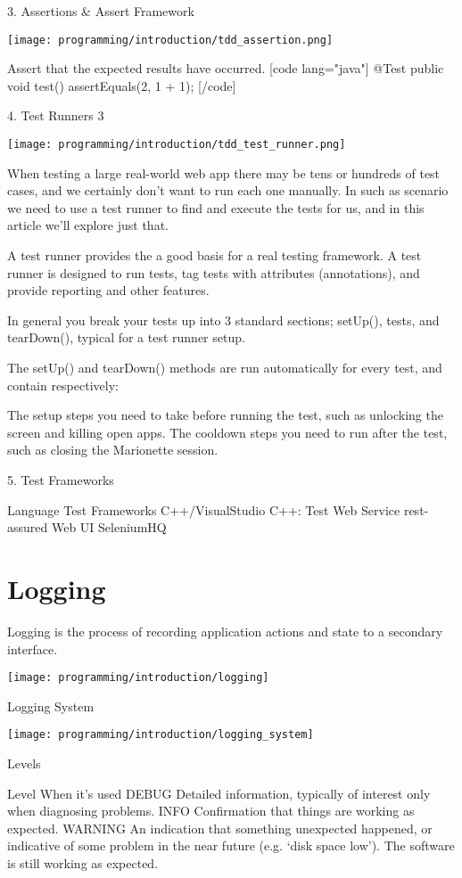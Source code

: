 3. Assertions & Assert Framework

\texttt{[image: programming/introduction/tdd\_assertion.png]}

Assert that the expected results have occurred.
[code lang="java"] @Test public void test() { assertEquals(2, 1 + 1); } [/code]


4. Test Runners 3

\texttt{[image: programming/introduction/tdd\_test\_runner.png]}

When testing a large real-world web app there may be tens or hundreds of test cases, and we certainly don't want to run each one manually. In such as scenario we need to use a test runner to find and execute the tests for us, and in this article we'll explore just that.

A test runner provides the a good basis for a real testing framework. A test runner is designed to run tests, tag tests with attributes (annotations), and provide reporting and other features.

In general you break your tests up into 3 standard sections; setUp(), tests, and tearDown(), typical for a test runner setup.

The setUp() and tearDown() methods are run automatically for every test, and contain respectively:

The setup steps you need to take before running the test, such as unlocking the screen and killing open apps.
The cooldown steps you need to run after the test, such as closing the Marionette session.

5. Test Frameworks

Language	Test Frameworks
C++/VisualStudio	C++: Test
Web Service	rest-assured
Web UI	SeleniumHQ

\section{Logging}

Logging is the process of recording application actions and state to a secondary interface.

\texttt{[image: programming/introduction/logging]}

Logging System

\texttt{[image: programming/introduction/logging\_system]}

Levels

Level	When it’s used
DEBUG	Detailed information, typically of interest only when diagnosing problems.
INFO	Confirmation that things are working as expected.
WARNING	An indication that something unexpected happened, or indicative of some problem in the near future (e.g. ‘disk space low’). The software is still working as expected.

